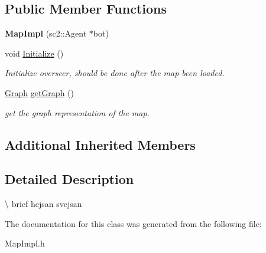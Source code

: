 \subsection*{Public Member Functions}
\begin{DoxyCompactItemize}
\item 
{\bfseries Map\+Impl} (sc2\+::\+Agent $\ast$bot)\hypertarget{classOverseer_1_1MapImpl_a9c30887c6f342971fabd54d23b36a765}{}\label{classOverseer_1_1MapImpl_a9c30887c6f342971fabd54d23b36a765}

\item 
void \hyperlink{classOverseer_1_1MapImpl_a5ec5b37d1ae07732a99845bfbbfce016}{Initialize} ()\hypertarget{classOverseer_1_1MapImpl_a5ec5b37d1ae07732a99845bfbbfce016}{}\label{classOverseer_1_1MapImpl_a5ec5b37d1ae07732a99845bfbbfce016}

\begin{DoxyCompactList}\small\item\em Initialize overseer, should be done after the map been loaded. \end{DoxyCompactList}\item 
\hyperlink{classOverseer_1_1Graph}{Graph} \hyperlink{classOverseer_1_1MapImpl_abedbb01faa88ff9bd3f8cd2dbec0dead}{get\+Graph} ()\hypertarget{classOverseer_1_1MapImpl_abedbb01faa88ff9bd3f8cd2dbec0dead}{}\label{classOverseer_1_1MapImpl_abedbb01faa88ff9bd3f8cd2dbec0dead}

\begin{DoxyCompactList}\small\item\em get the graph representation of the map. \end{DoxyCompactList}\end{DoxyCompactItemize}
\subsection*{Additional Inherited Members}


\subsection{Detailed Description}
\textbackslash{} brief hejsan svejsan 

The documentation for this class was generated from the following file\+:\begin{DoxyCompactItemize}
\item 
Map\+Impl.\+h\end{DoxyCompactItemize}
